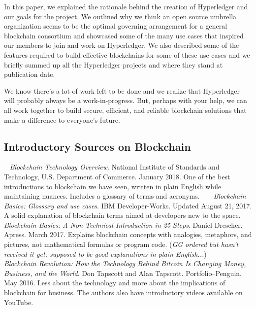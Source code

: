 In this paper, we explained the rationale behind the creation of Hyperledger and our goals for the project. We outlined why we think an open source umbrella organization seems to be the optimal governing arrangement for a general blockchain consortium and showcased some of the many use cases that inspired our members to join and work on Hyperledger. We also described some of the features required to build effective blockchains for some of these use cases and we briefly summed up all the Hyperledger projects and where they stand at publication date. 

We know there's a lot of work left to be done and we realize that Hyperledger will probably always be a work-in-progress. But, perhaps with your help, we can all work together to build secure, efficient, and reliable blockchain solutions that make a difference to everyone's future.

\subsection{Introductory Sources on Blockchain}
~\newline
\emph{Blockchain Technology Overview}. National Institute of Standards and Technology, U.S. Department of Commerce. January 2018. One of the best introductions to blockchain we have seen, written in plain English while maintaining nuances. Includes a glossary of terms and acronyms. 
~\newline
~\newline
\emph{Blockchain Basics: Glossary and use cases}. IBM Developer-Works. Updated August 21, 2017. A solid explanation of blockchain terms aimed at developers new to the space. 
~\newline
~\newline
\emph{Blockchain Basics: A Non-Technical Introduction in 25 Steps}. Daniel Drescher. Apress. March 2017. Explains blockchain concepts with analogies, metaphors, and pictures, not mathematical formulas or program code. (\emph{GG ordered but hasn't received it yet, supposed to be good explanations in plain English...})
~\newline
~\newline
\emph{Blockchain Revolution: How the Technology Behind Bitcoin Is Changing Money, Business, and the World}. Don Tapscott and Alan Tapscott. Portfolio--Penguin. May 2016. Less about the technology and more about the implications of blockchain for business. The authors also have introductory videos available on YouTube. 

